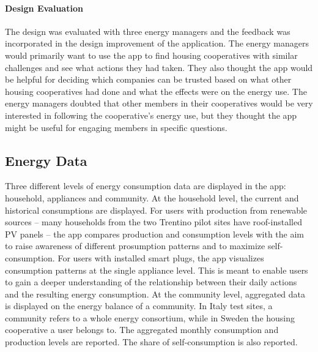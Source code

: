 \paragraph{Design Evaluation}

The design was evaluated with three energy managers and the feedback was incorporated in the design improvement of the application. The energy managers would primarily want to use the app to find housing cooperatives with similar challenges and see what actions they had taken. They also thought the app would be helpful for deciding which companies can be trusted based on what other housing cooperatives had done and what the effects were on the energy use. The energy managers doubted that other members in their cooperatives would be very interested in following the cooperative's energy use, but they thought the app might be useful for engaging members in specific questions. 

\subsection{Energy Data} 
\label{sect:load_shifting}

Three different levels of energy consumption data are displayed in the app: household, appliances and community. 
At the household level, the current and historical consumptions are displayed. For users with production from renewable sources -- many households from the two Trentino pilot sites have roof-installed PV panels -- the app compares production and consumption levels with the aim to raise awareness of different prosumption patterns and to maximize self-consumption. 
% 
For users with installed smart plugs, the app visualizes consumption patterns at the single appliance level. This is meant to enable users to gain a deeper understanding of the relationship between their daily actions and the resulting energy consumption. 
%
At the community level, aggregated data is displayed on the energy balance of a community. In Italy test sites, a community refers to a whole energy consortium, while in Sweden the housing cooperative a user belongs to. 
The aggregated monthly consumption and production levels are reported. The share of self-consumption is also reported. 


